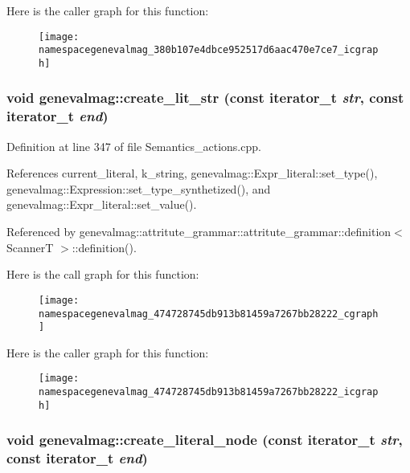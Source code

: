 Here is the caller graph for this function:\nopagebreak
\begin{figure}[H]
\begin{center}
\leavevmode
\texttt{[image: namespacegenevalmag\_380b107e4dbce952517d6aac470e7ce7\_icgraph]}
\end{center}
\end{figure}
\hypertarget{namespacegenevalmag_474728745db913b81459a7267bb28222}{
\subsubsection[{create\_\-lit\_\-str}]{\setlength{\rightskip}{0pt plus 5cm}void genevalmag::create\_\-lit\_\-str (const iterator\_\-t {\em str}, \/  const iterator\_\-t {\em end})}}
\label{namespacegenevalmag_474728745db913b81459a7267bb28222}




Definition at line 347 of file Semantics\_\-actions.cpp.

References current\_\-literal, k\_\-string, genevalmag::Expr\_\-literal::set\_\-type(), genevalmag::Expression::set\_\-type\_\-synthetized(), and genevalmag::Expr\_\-literal::set\_\-value().

Referenced by genevalmag::attritute\_\-grammar::attritute\_\-grammar::definition$<$ ScannerT $>$::definition().

Here is the call graph for this function:\nopagebreak
\begin{figure}[H]
\begin{center}
\leavevmode
\texttt{[image: namespacegenevalmag\_474728745db913b81459a7267bb28222\_cgraph]}
\end{center}
\end{figure}


Here is the caller graph for this function:\nopagebreak
\begin{figure}[H]
\begin{center}
\leavevmode
\texttt{[image: namespacegenevalmag\_474728745db913b81459a7267bb28222\_icgraph]}
\end{center}
\end{figure}
\hypertarget{namespacegenevalmag_5acc69c06c112cad864e048a095396c5}{
\subsubsection[{create\_\-literal\_\-node}]{\setlength{\rightskip}{0pt plus 5cm}void genevalmag::create\_\-literal\_\-node (const iterator\_\-t {\em str}, \/  const iterator\_\-t {\em end})}}
\label{namespacegenevalmag_5acc69c06c112cad864e048a095396c5}


